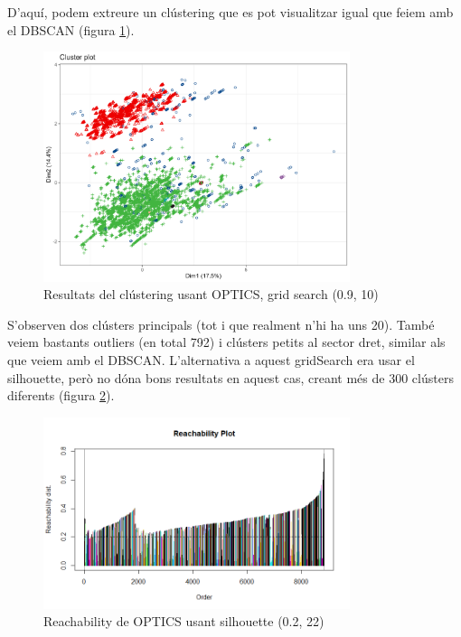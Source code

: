 \documentclass{article}
\begin{document}
D'aquí, podem extreure un clústering que es pot visualitzar igual que feiem amb el DBSCAN (figura \ref{fig:OPTICS_grid_res}).

\begin{figure}[H]
    \centering
    \includegraphics[width=0.8\textwidth]{Images/4_clustering/optics/opticsgrid.png}
    \caption{Resultats del clústering usant OPTICS, grid search (0.9, 10)}
    \label{fig:OPTICS_grid_res}
\end{figure}


S'observen dos clústers principals (tot i que realment n'hi ha uns 20). També veiem bastants outliers (en total 792) i clústers petits al sector dret, similar als que veiem amb el DBSCAN. L'alternativa a aquest gridSearch era usar el silhouette, però no dóna bons resultats en aquest cas, creant més de 300 clústers diferents (figura \ref{fig:OPTICS_silo}).
\begin{figure}[H]
    \centering
    \includegraphics[width=0.8\textwidth]{Images/4_clustering/optics/siloreachability.png}
    \caption{Reachability de OPTICS usant silhouette (0.2, 22)}
    \label{fig:OPTICS_silo}
\end{figure}
\end{document}

